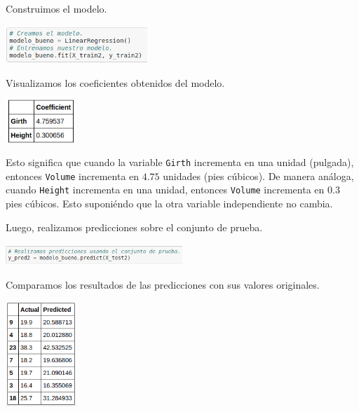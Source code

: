 \documentclass[letterpaper,11pt]{article}
\begin{document}
\begin{enumerate}
\begin{enumerate}
        \newpage
        Construimos el modelo.
        \begin{center}
            \includegraphics[width=0.4\textwidth]{imagenes/modelo_lineal.png}
        \end{center}

        Visualizamos los coeficientes obtenidos del modelo.
        \begin{center}
            \includegraphics[width=0.2\textwidth]{imagenes/coef.png}
        \end{center}

        Esto significa que cuando la variable \texttt{Girth} incrementa en una 
        unidad (pulgada), entonces \texttt{Volume} incrementa en $4.75$ 
        unidades (pies cúbicos). De manera análoga, cuando \texttt{Height} 
        incrementa en una unidad, entonces \texttt{Volume} incrementa en 
        $0.3$ pies cúbicos. Esto suponiéndo que la otra variable independiente
        no cambia.

        Luego, realizamos predicciones sobre el conjunto de prueba.
        \begin{center}
            \includegraphics[width=0.5\textwidth]{imagenes/pred_lineal.png}
        \end{center}

        Comparamos los resultados de las predicciones con sus valores originales.
        \begin{center}
            \includegraphics[width=0.2\textwidth]{imagenes/predicciones_lineal.png}
        \end{center}


\end{enumerate}
\end{enumerate}
\end{document}
